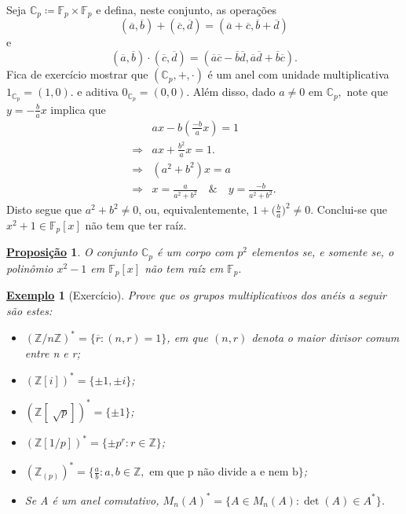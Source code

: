 \documentclass{article}
\newtheorem*{prop*}{\underline{Proposi\c c\~ao}}
\newtheorem{example}{\underline{Exemplo}}
\begin{document}
  Seja \(\mathbb{C}_{p}\coloneqq \mathbb{F}_{p}\times \mathbb{F}_{p}\) e defina, neste conjunto, as operações 
  \[
    (\overline{a}, \overline{b}) + (\overline{c}, \overline{d}) = (\overline{a}+\overline{c}, \overline{b}+\overline{d})
  \]
e 
  \[
    (\overline{a}, \overline{b})\cdot (\overline{c}, \overline{d}) = (\overline{a}\overline{c} - \overline{b}\overline{d}, \overline{a}\overline{d}+\overline{b}\overline{c}).
  \]
Fica de exercício mostrar que \((\mathbb{C}_{p}, +, \cdot )\) é um anel com unidade multiplicativa \(1_{\mathbb{C}_{p}} = (1, 0).\) e aditiva \(0_{\mathbb{C}_{p}} = (0, 0).\)
Além disso, dado \(a\neq 0\) em \(\mathbb{C}_{p},\) note que \(y = -\frac{b}{a}x\) implica que 
\begin{align*}
  &ax - b(\frac{-b}{a}x) = 1\\
  \Rightarrow & ax + \frac{b^{2}}{a}x = 1.\\
  \Rightarrow & (a^{2} + b^{2})x = a\\
  \Rightarrow & x = \frac{a}{a^{2}+b^{2}} \quad\&\quad y = \frac{-b}{a^{2}+b^{2}}.
\end{align*}
Disto segue que \(a^{2} + b^{2}\neq 0\), ou, equivalentemente, \(1 + \biggl(\frac{b}{a}\biggr)^{2}\neq 0\). Conclui-se que \(x^{2}+1\in \mathbb{F}_{p}[x]\) não tem que ter raíz.
\begin{prop*}
  O conjunto \(\mathbb{C}_{p}\) é um corpo com \(p^{2}\) elementos se, e somente se, o polinômio \(x^{2}-1 \) em \(\mathbb{F}_{p}[x]\) não tem raíz em \(\mathbb{F}_{p}.\)
\end{prop*}
\begin{example}[Exercício]
  Prove que os grupos multiplicativos dos anéis a seguir são estes:
  \begin{itemize}
    \item[1)] \((\mathbb{Z}/n \mathbb{Z})^{*} = \{\overline{r}: (n, r) = 1\}\), em que \((n, r)\) denota o \textit{maior divisor comum} entre n e r;
    \item[2)] \((\mathbb{Z}[i])^{*}=\{\pm1, \pm i\}\);
    \item[3)] \((\mathbb{Z}[\sqrt[]{p}])^{*} = \{\pm1\}\);
    \item[4)] \((\mathbb{Z}[1/p])^{*} = \{\pm p^{r}: r\in \mathbb{Z}\}\);
    \item[5)] \((\mathbb{Z}_{(p)})^{*} = \biggl\{\frac{a}{b}: a, b\in \mathbb{Z}, \text{ em que p não divide a e nem b}\biggr\}\);
    \item[6)] Se A é um anel comutativo, \(M_{n}(A)^{*} = \{A\in M_{n}(A): \det{(A)}\in A^{*}\}\).
  \end{itemize}
\end{example}
\newpage
\end{document}
